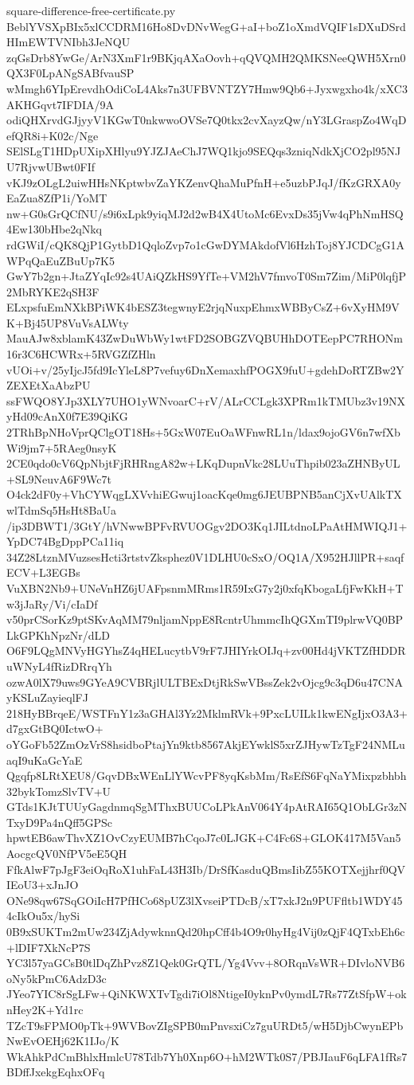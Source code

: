 \documentclass[11pt]{article}
\theoremstyle{definition}
\theoremstyle{remark}
\begin{document}
\begin{filecontents*}[overwrite]{square-difference-free-certificate.py}
BeblYVSXpBIx5xlCCDRM16Ho8DvDNvWegG+aI+boZ1oXmdVQIF1sDXuDSrdHImEWTVNIbh3JeNQU
zqGsDrb8YwGe/ArN3XmF1r9BKjqAXaOovh+qQVQMH2QMKSNeeQWH5Xrn0QX3F0LpANgSABfvauSP
wMmgh6YIpErevdhOdiCoL4Aks7n3UFBVNTZY7Hmw9Qb6+Jyxwgxho4k/xXC3AKHGqvt7IFDIA/9A
odiQHXrvdGJjyyV1KGwT0nkwwoOVSe7Q0tkx2cvXayzQw/nY3LGraspZo4WqDefQR8i+K02c/Nge
SElSLgT1HDpUXipXHlyu9YJZJAeChJ7WQ1kjo9SEQqs3zniqNdkXjCO2pl95NJU7RjvwUBwt0FIf
vKJ9zOLgL2uiwHHsNKptwbvZaYKZenvQhaMuPfnH+e5uzbPJqJ/fKzGRXA0yEaZua8ZfP1i/YoMT
nw+G0sGrQCfNU/s9i6xLpk9yiqMJ2d2wB4X4UtoMc6EvxDs35jVw4qPhNmHSQ4Ew130bHbe2qNkq
rdGWiI/cQK8QjP1GytbD1QqloZvp7o1cGwDYMAkdofVl6HzhToj8YJCDCgG1AWPqQaEuZBuUp7K5
GwY7b2gn+JtaZYqIc92s4UAiQZkHS9YfTe+VM2hV7fmvoT0Sm7Zim/MiP0lqfjP2MbRYKE2qSH3F
ELxpsfuEmNXkBPiWK4bESZ3tegwnyE2rjqNuxpEhmxWBByCsZ+6vXyHM9VK+Bj45UP8VuVsALWty
MauAJw8xblamK43ZwDuWbWy1wtFD2SOBGZVQBUHhDOTEepPC7RHONm16r3C6HCWRx+5RVGZfZHln
vUOi+v/25yIjcJ5fd9IcYleL8P7vefuy6DnXemaxhfPOGX9fuU+gdehDoRTZBw2YZEXEtXaAbzPU
ssFWQO8YJp3XLY7UHO1yWNvoarC+rV/ALrCCLgk3XPRm1kTMUbz3v19NXyHd09cAnX0f7E39QiKG
2TRhBpNHoVprQClgOT18Hs+5GxW07EuOaWFnwRL1n/ldax9ojoGV6n7wfXbWi9jm7+5RAeg0nsyK
2CE0qdo0cV6QpNbjtFjRHRngA82w+LKqDupnVkc28LUuThpib023aZHNByUL+SL9NeuvA6F9Wc7t
O4ck2dF0y+VhCYWqgLXVvhiEGwuj1oacKqe0mg6JEUBPNB5anCjXvUAlkTXwlTdmSq5HsHt8BaUa
/ip3DBWT1/3GtY/hVNwwBPFvRVUOGgv2DO3Kq1JILtdnoLPaAtHMWIQJ1+YpDC74BgDppPCa11iq
34Z28LtznMVuzsesHcti3rtstvZksphez0V1DLHU0cSxO/OQ1A/X952HJllPR+saqfECV+L3EGBs
VuXBN2Nb9+UNeVnHZ6jUAFpsnmMRms1R59IxG7y2j0xfqKbogaLfjFwKkH+Tw3jJaRy/Vi/cIaDf
v50prCSorKz9ptSKvAqMM79nljamNppE8RcntrUhmmcIhQGXmTI9plrwVQ0BPLkGPKhNpzNr/dLD
O6F9LQgMNVyHGYhsZ4qHELucytbV9rF7JHIYrkOIJq+zv00Hd4jVKTZfHDDRuWNyL4fRizDRrqYh
ozwA0lX79uws9GYeA9CVBRjlULTBExDtjRkSwVBssZek2vOjcg9c3qD6u47CNAyKSLuZayieqlFJ
218HyBBrqeE/WSTFnY1z3aGHAl3Yz2MklmRVk+9PxcLUILk1kwENgIjxO3A3+d7gxGtBQ0IctwO+
oYGoFb52ZmOzVrS8hsidboPtajYn9ktb8567AkjEYwklS5xrZJHywTzTgF24NMLuaqI9uKaGcYaE
Qgqfp8LRtXEU8/GqvDBxWEnLlYWcvPF8yqKsbMm/RsEfS6FqNaYMixpzbhbh32bykTomzSlvTV+U
GTds1KJtTUUyGagdnmqSgMThxBUUCoLPkAnV064Y4pAtRAI65Q1ObLGr3zNTxyD9Pa4nQff5GPSc
hpwtEB6awThvXZ1OvCzyEUMB7hCqoJ7c0LJGK+C4Fc6S+GLOK417M5Van5AocgcQV0NfPV5eE5QH
FfkAlwF7pJgF3eiOqRoX1uhFaL43H3Ib/DrSfKasduQBmsIibZ55KOTXejjhrf0QVIEoU3+xJnJO
ONe98qw67SqGOiIcH7PfHCo68pUZ3lXvseiPTDcB/xT7xkJ2n9PUFfltb1WDY454cIkOu5x/hySi
0B9xSUKTm2mUw234ZjAdywknnQd20hpCff4b4O9r0hyHg4Vij0zQjF4QTxbEh6c+lDIF7XkNcP7S
YC3l57yaGCsB0tlDqZhPvz8Z1Qek0GrQTL/Yg4Vvv+8ORqnVsWR+DIvloNVB6oNy5kPmC6AdzD3c
JYeo7YIC8rSgLFw+QiNKWXTvTgdi7iOl8NtigeI0yknPv0ymdL7Rs77ZtSfpW+oknHey2K+Yd1rc
TZcT9sFPMO0pTk+9WVBovZIgSPB0mPnvsxiCz7guURDt5/wH5DjbCwynEPbNwEvOEHj62K1IJo/K
WkAhkPdCmBhlxHmlcU78Tdb7Yh0Xnp6O+hM2WTk0S7/PBJIauF6qLFA1fRs7BDffJxekgEqhxOFq

\end{filecontents*}
\end{document}
